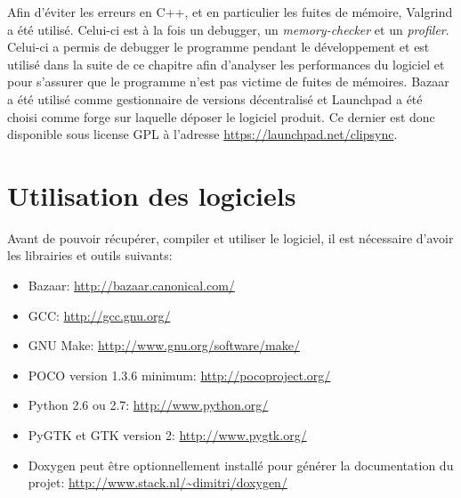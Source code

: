Afin d'éviter les erreurs en C++, et en particulier les fuites de mémoire,
Valgrind\cite{valgrind} a été utilisé. Celui-ci est à la fois un debugger,
un \emph{memory-checker} et un \emph{profiler}. Celui-ci a permis de debugger
le programme pendant le développement et est utilisé dans la suite de ce
chapitre afin d'analyser les performances du logiciel et pour s'assurer que
le programme n'est pas victime de fuites de mémoires.
Bazaar\cite{bzr} a été utilisé comme gestionnaire de versions décentralisé et
Launchpad\cite{launchpad} a été choisi comme forge sur laquelle déposer le
logiciel produit. Ce dernier est donc disponible sous license GPL à l'adresse
\url{https://launchpad.net/clipsync}.

\section{Utilisation des logiciels}
Avant de pouvoir récupérer, compiler et utiliser le logiciel, il est nécessaire
d'avoir les librairies et outils suivants:
\begin{itemize}
\item Bazaar: \url{http://bazaar.canonical.com/}
\item GCC: \url{http://gcc.gnu.org/}
\item GNU Make: \url{http://www.gnu.org/software/make/}
\item POCO version 1.3.6 minimum: \url{http://pocoproject.org/}
\item Python 2.6 ou 2.7: \url{http://www.python.org/}
\item PyGTK et GTK version 2: \url{http://www.pygtk.org/}
\item Doxygen peut être optionnellement installé pour générer la documentation
  du projet: \url{http://www.stack.nl/~dimitri/doxygen/}
\end{itemize}

